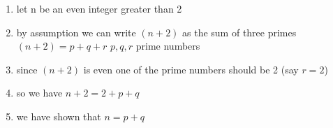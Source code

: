 \documentclass[12pt]{article}
\begin{document}
\begin{enumerate}[a)]
\begin{enumerate}[1)]
        \begin{enumerate}[4.1)]
            \item let n be an even integer greater than 2
            \item by assumption we can write $(n+2)$ as the sum of three primes $(n+2) = p + q + r$ $p,q,r$ prime numbers 
            \item since $(n+2)$ is even one of the prime numbers should be 2 (say $r=2$)
            \item so we have $n+2 = 2 + p + q$
            \item we have shown that $n = p+q$
        \end{enumerate}
    \end{enumerate}
\end{enumerate}
\end{document}
